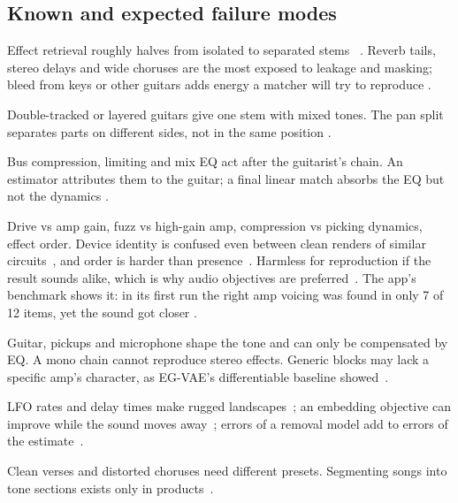 \subsection{Known and expected failure modes}

\begin{description}[style=nextline,leftmargin=1.2cm]
\item[Separation artefacts] Effect retrieval roughly halves from isolated to
  separated stems \reported~\cite{yeh2025fxencoder}. Reverb tails, stereo delays
  and wide choruses are the most exposed to leakage and masking; bleed from keys
  or other guitars adds energy a matcher will try to reproduce \expected.
\item[Several guitars in one stem] Double-tracked or layered guitars give one
  stem with mixed tones. The pan split separates parts on different sides, not
  in the same position \expected.
\item[Mixing and mastering] Bus compression, limiting and mix EQ act after the
  guitarist's chain. An estimator attributes them to the guitar; a final linear
  match absorbs the EQ but not the dynamics \expected.
\item[Non-uniqueness] Drive vs amp gain, fuzz vs high-gain amp, compression vs
  picking dynamics, effect order. Device identity is confused even between clean
  renders of similar circuits~\cite{comunita2021guitar}, and order is harder than
  presence~\cite{wada2025hyperbolic}. Harmless for reproduction if the result
  sounds alike, which is why audio objectives are preferred~\cite{peladeau2024blind}.
  The app's benchmark shows it: in its first run the right amp voicing was
  found in only 7 of 12 items, yet the sound got closer \measured.
\item[Equipment outside the chain] Guitar, pickups and microphone shape the tone
  and can only be compensated by EQ. A mono chain cannot reproduce stereo
  effects. Generic blocks may lack a specific amp's character, as EG-VAE's
  differentiable baseline showed~\cite{yeh2026egvae}.
\item[Search pathologies] LFO rates and delay times make rugged
  landscapes~\cite{okita2026audio,uzrad2024diffmoog}; an embedding objective can
  improve while the sound moves away~\cite{long2026tape}; errors of a removal
  model add to errors of the estimate~\cite{take2024audio}.
\item[Tone changes within a song] Clean verses and distorted choruses need
  different presets. Segmenting songs into tone sections exists only in
  products~\cite{bouharb2026gptonebuilder}.
\end{description}

